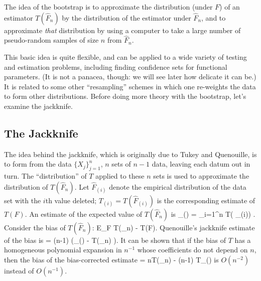 The idea of the bootstrap is to approximate the distribution (under $F$)
of an estimator
$T(\hat{F}_n)$ by the distribution of the estimator under $\hat{F}_n$,
and to approximate {\em that} distribution by using a computer to
take a large number of pseudo-random samples of size $n$ from 
$\hat{F}_n$.

This basic idea is quite flexible, and can be applied to a wide variety of
testing and estimation problems, including finding confidence sets for
functional parameters.  
(It is not a panacea, though: we will see later how delicate it can be.)
It is related to some other ``resampling'' schemes in which
one re-weights the data to form other distributions.
Before doing more theory with the bootstrap, let's examine the jackknife.

\subsection{The Jackknife}
The idea behind the jackknife, which is originally due to Tukey and
Quenouille, is to
form from the data $\{ X_j \}_{j=1}^n$, $n$ sets of $n-1$ data,
leaving each datum out
in turn.
The ``distribution'' of $T$ applied to these $n$ sets is used to approximate
the distribution of $T(\hat{F}_n)$.
Let $\hat{F}_{(i)}$ denote  the empirical distribution of the data
set with the $i$th value deleted;
$T_{(i)} = T( \hat{F}_{(i)})$ is the corresponding
estimate of $T(F)$.
An estimate of the expected value of $T(\hat{F}_n)$ is
\beq
    _{(\cdot)} =  \sum_{i=1}^n T( _{(i)}) .
\eeq
Consider the bias of $T(\hat{F}_n)$:
\beq
    E_F T(_n) - T(F).
\eeq
Quenouille's jackknife estimate of the bias is
\beq
     = (n-1) (_{(\cdot)} - T(_n) ).
\eeq
It can be shown that if the bias of $T$ has a homogeneous
polynomial expansion
in $n^{-1}$ whose coefficients do not depend on $n$,
then the bias of the bias-corrected estimate
\beq
     = nT(_n) - (n-1) T_{(\cdot)}
\eeq
is $O(n^{-2})$ instead of $O(n^{-1})$.

